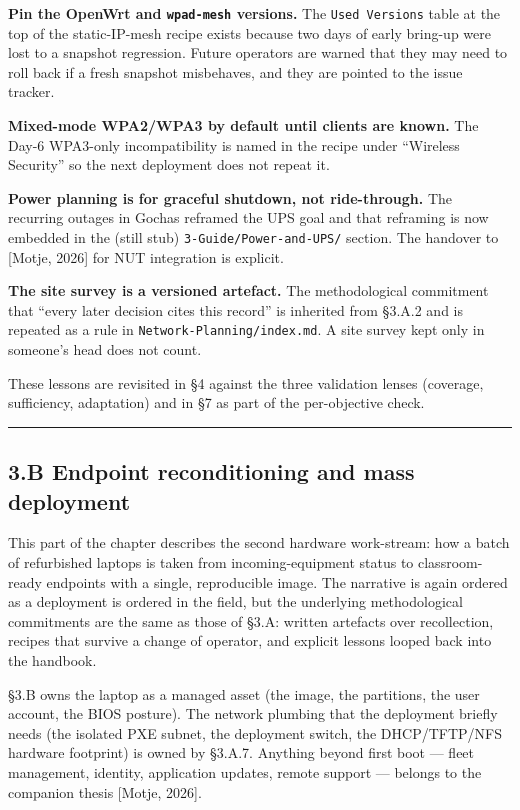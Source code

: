 \textbf{Pin the OpenWrt and \texttt{wpad-mesh} versions.} The
\texttt{Used\ Versions} table at the top of the static-IP-mesh recipe
exists because two days of early bring-up were lost to a snapshot
regression. Future operators are warned that they may need to roll back
if a fresh snapshot misbehaves, and they are pointed to the issue
tracker.

\textbf{Mixed-mode WPA2/WPA3 by default until clients are known.} The
Day-6 WPA3-only incompatibility is named in the recipe under ``Wireless
Security'' so the next deployment does not repeat it.

\textbf{Power planning is for graceful shutdown, not ride-through.} The
recurring outages in Gochas reframed the UPS goal and that reframing is
now embedded in the (still stub) \texttt{3-Guide/Power-and-UPS/}
section. The handover to {[}Motje, 2026{]} for NUT integration is
explicit.

\textbf{The site survey is a versioned artefact.} The methodological
commitment that ``every later decision cites this record'' is inherited
from §3.A.2 and is repeated as a rule in
\texttt{Network-Planning/index.md}. A site survey kept only in someone's
head does not count.

These lessons are revisited in §4 against the three validation lenses
(coverage, sufficiency, adaptation) and in §7 as part of the
per-objective check.

\begin{center}\rule{0.5\linewidth}{0.5pt}\end{center}

\hypertarget{b-endpoint-reconditioning-and-mass-deployment}{%
\subsection{3.B Endpoint reconditioning and mass
deployment}\label{b-endpoint-reconditioning-and-mass-deployment}}

This part of the chapter describes the second hardware work-stream: how
a batch of refurbished laptops is taken from incoming-equipment status
to classroom-ready endpoints with a single, reproducible image. The
narrative is again ordered as a deployment is ordered in the field, but
the underlying methodological commitments are the same as those of §3.A:
written artefacts over recollection, recipes that survive a change of
operator, and explicit lessons looped back into the handbook.

§3.B owns the laptop as a managed asset (the image, the partitions, the
user account, the BIOS posture). The network plumbing that the
deployment briefly needs (the isolated PXE subnet, the deployment
switch, the DHCP/TFTP/NFS hardware footprint) is owned by §3.A.7.
Anything beyond first boot --- fleet management, identity, application
updates, remote support --- belongs to the companion thesis {[}Motje,
2026{]}.

